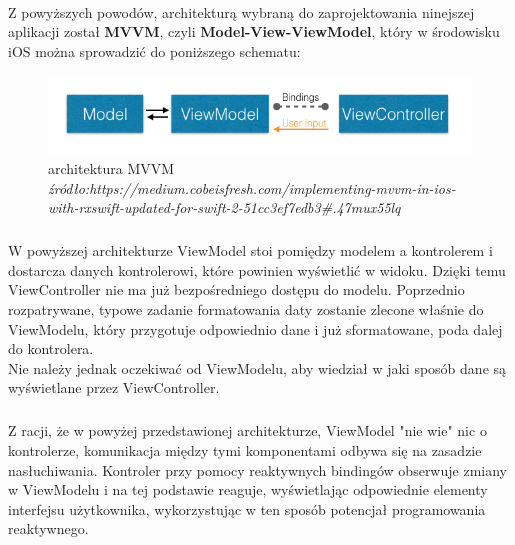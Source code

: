 \documentclass[12pt,oneside,a4paper]{report}
\begin{document}
\paragraph{}Z powyższych powodów, architekturą wybraną do zaprojektowania ninejszej aplikacji został \textbf{MVVM}, czyli \textbf{Model-View-ViewModel}, który w środowisku iOS można sprowadzić do poniższego schematu:
  	\begin{figure}[ht!]
  	\centering
  	\includegraphics[width=13cm]{rxMVVM}
  	\caption{architektura MVVM
  		\textit{źródło:https://medium.cobeisfresh.com/implementing-mvvm-in-ios-with-rxswift-updated-for-swift-2-51cc3ef7edb3\#.47mux55lq}}
  	\label{rxMVVM}
  \end{figure}
\subparagraph{}W powyższej architekturze ViewModel stoi pomiędzy modelem a kontrolerem i dostarcza danych kontrolerowi, które powinien wyświetlić w widoku. Dzięki temu ViewController nie ma już bezpośredniego dostępu do modelu. Poprzednio rozpatrywane, typowe zadanie formatowania daty zostanie zlecone właśnie do ViewModelu, który przygotuje odpowiednio dane i już sformatowane, poda dalej do kontrolera.
\\Nie należy jednak oczekiwać od ViewModelu, aby wiedział w jaki sposób dane są wyświetlane przez ViewController. 
\subparagraph{}Z racji, że w powyżej przedstawionej architekturze, ViewModel "nie wie" nic o kontrolerze, komunikacja między tymi komponentami odbywa się na zasadzie nasłuchiwania. Kontroler przy pomocy reaktywnych bindingów obserwuje zmiany w ViewModelu i na tej podstawie reaguje, wyświetlając odpowiednie elementy interfejsu użytkownika, wykorzystując w ten sposób potencjał programowania reaktywnego. 
\end{document}

